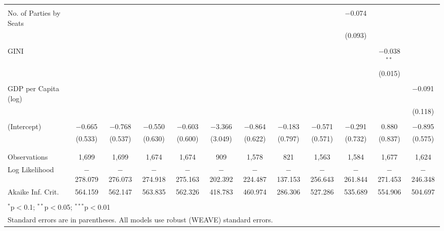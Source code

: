 \documentclass[a4paper]{article}\usepackage[]{graphicx}\usepackage[]{color}
\begin{document}
\begin{table}[H]
\begin{center}
{{\begin{tabular}{@{\extracolsep{5pt}}lccccccccccc}
  & & & & & & & & & & & \\ 
 No. of Parties by Seats &  &  &  &  &  &  &  &  & $-$0.074 &  &  \\ 
  &  &  &  &  &  &  &  &  & (0.093) &  &  \\ 
  & & & & & & & & & & & \\ 
 GINI &  &  &  &  &  &  &  &  &  & $-$0.038$^{**}$ &  \\ 
  &  &  &  &  &  &  &  &  &  & (0.015) &  \\ 
  & & & & & & & & & & & \\ 
 GDP per Capita (log) &  &  &  &  &  &  &  &  &  &  & $-$0.091 \\ 
  &  &  &  &  &  &  &  &  &  &  & (0.118) \\ 
  & & & & & & & & & & & \\ 
 (Intercept) & $-$0.665 & $-$0.768 & $-$0.550 & $-$0.603 & $-$3.366 & $-$0.864 & $-$0.183 & $-$0.571 & $-$0.291 & 0.880 & $-$0.895 \\ 
  & (0.533) & (0.537) & (0.630) & (0.600) & (3.049) & (0.622) & (0.797) & (0.571) & (0.732) & (0.837) & (0.575) \\ 
  & & & & & & & & & & & \\ 
\hline \\[-1.8ex] 
Observations & 1,699 & 1,699 & 1,674 & 1,674 & 909 & 1,578 & 821 & 1,563 & 1,584 & 1,677 & 1,624 \\ 
Log Likelihood & $-$278.079 & $-$276.073 & $-$274.918 & $-$275.163 & $-$202.392 & $-$224.487 & $-$137.153 & $-$256.643 & $-$261.844 & $-$271.453 & $-$246.348 \\ 
Akaike Inf. Crit. & 564.159 & 562.147 & 563.835 & 562.326 & 418.783 & 460.974 & 286.306 & 527.286 & 535.689 & 554.906 & 504.697 \\ 
\hline 
\hline \\[-1.8ex] 
\multicolumn{12}{l}{$^{*}$p$<$0.1; $^{**}$p$<$0.05; $^{***}$p$<$0.01} \\ 
\multicolumn{12}{l}{Standard errors are in parentheses. All models use robust (WEAVE) standard errors.} \\ 
\end{tabular} 

}}
\end{center}

\end{table}
\end{document}
